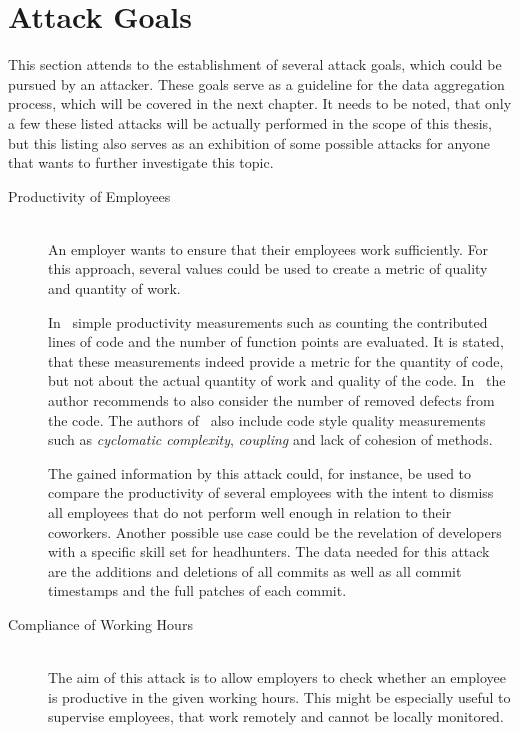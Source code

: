 \section{Attack Goals}\label{attack-goals}
This section attends to the establishment of several attack goals, which could be pursued by an attacker.
These goals serve as a guideline for the data aggregation process, which will be covered in the next chapter.
It needs to be noted, that only a few these listed attacks will be actually performed in the scope of this thesis, but this listing also serves as an exhibition of some possible attacks for anyone that wants to further investigate this topic.

\begin{description}
    \item[Productivity of Employees]~\label{attack:employer-monitoring} \hfill \\
        An employer wants to ensure that their employees work sufficiently.
        For this approach, several values could be used to create a metric of quality and quantity of work.

        In~\cite[p.~3]{article:job-productivity} simple productivity measurements such as counting the contributed lines of code and the number of function points are evaluated.
        It is stated, that these measurements indeed provide a metric for the quantity of code, but not about the actual quantity of work and quality of the code.
        In~\cite[p.~43]{article:measuring-programming-quality} the author recommends to also consider the number of removed defects from the code.
        The authors of~\cite[p.~257]{article:software-productivity} also include code style quality measurements such as \emph{cyclomatic complexity}, \emph{coupling} and lack of cohesion of methods.

        The gained information by this attack could, for instance, be used to compare the productivity of several employees with the intent to dismiss all employees that do not perform well enough in relation to their coworkers.
        Another possible use case could be the revelation of developers with a specific skill set for headhunters.
        The data needed for this attack are the additions and deletions of all commits as well as all commit timestamps and the full patches of each commit.

    \item[Compliance of Working Hours] \hfill \\
        The aim of this attack is to allow employers to check whether an employee is productive in the given working hours.
        This might be especially useful to supervise employees, that work remotely and cannot be locally monitored.


\end{description}

